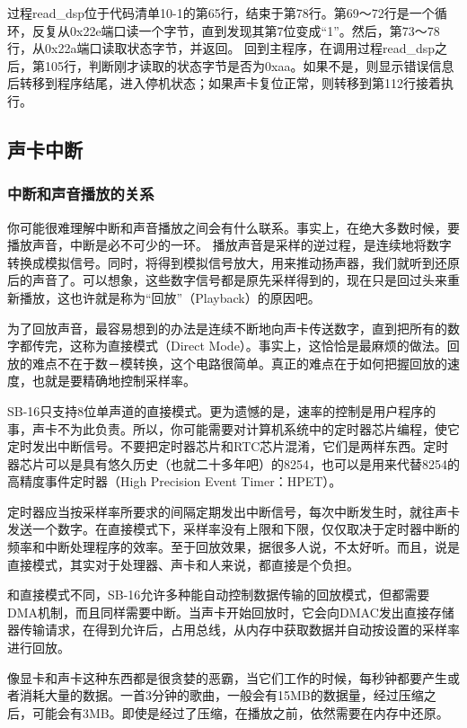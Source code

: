 \documentclass[12pt]{article}
\begin{document}
\begin{CJK}{UTF8}{gbsn}
过程read\_{}dsp位于代码清单10-1的第65行，结束于第78行。第69～72行是一个循环，反复从0x22e端口读一个字节，直到发现其第7位变成“1”。然后，第73～78行，从0x22a端口读取状态字节，并返回。
回到主程序，在调用过程read\_{}dsp之后，第105行，判断刚才读取的状态字节是否为0xaa。如果不是，则显示错误信息后转移到程序结尾，进入停机状态；如果声卡复位正常，则转移到第112行接着执行。

\subsection{声卡中断}
\subsubsection{中断和声音播放的关系}

你可能很难理解中断和声音播放之间会有什么联系。事实上，在绝大多数时候，要播放声音，中断是必不可少的一环。
播放声音是采样的逆过程，是连续地将数字转换成模拟信号。同时，将得到模拟信号放大，用来推动扬声器，我们就听到还原后的声音了。可以想象，这些数字信号都是原先采样得到的，现在只是回过头来重新播放，这也许就是称为“回放”（Playback）的原因吧。

为了回放声音，最容易想到的办法是连续不断地向声卡传送数字，直到把所有的数字都传完，这称为直接模式（Direct Mode）。事实上，这恰恰是最麻烦的做法。回放的难点不在于数－模转换，这个电路很简单。真正的难点在于如何把握回放的速度，也就是要精确地控制采样率。

SB-16只支持8位单声道的直接模式。更为遗憾的是，速率的控制是用户程序的事，声卡不为此负责。所以，你可能需要对计算机系统中的定时器芯片编程，使它定时发出中断信号。不要把定时器芯片和RTC芯片混淆，它们是两样东西。定时器芯片可以是具有悠久历史（也就二十多年吧）的8254，也可以是用来代替8254的高精度事件定时器（High Precision Event Timer：HPET）。

定时器应当按采样率所要求的间隔定期发出中断信号，每次中断发生时，就往声卡发送一个数字。在直接模式下，采样率没有上限和下限，仅仅取决于定时器中断的频率和中断处理程序的效率。至于回放效果，据很多人说，不太好听。而且，说是直接模式，其实对于处理器、声卡和人来说，都直接是个负担。

和直接模式不同，SB-16允许多种能自动控制数据传输的回放模式，但都需要DMA机制，而且同样需要中断。当声卡开始回放时，它会向DMAC发出直接存储器传输请求，在得到允许后，占用总线，从内存中获取数据并自动按设置的采样率进行回放。

像显卡和声卡这种东西都是很贪婪的恶霸，当它们工作的时候，每秒钟都要产生或者消耗大量的数据。一首3分钟的歌曲，一般会有15MB的数据量，经过压缩之后，可能会有3MB。即使是经过了压缩，在播放之前，依然需要在内存中还原。


\end{CJK}
\end{document}

